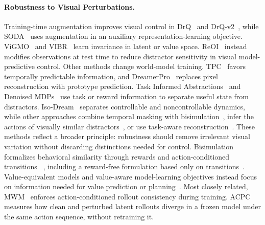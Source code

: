 \documentclass[10pt]{article}
\begin{document}
\paragraph{Robustness to Visual Perturbations.}
Training-time augmentation improves visual control in
DrQ~\cite{kostrikov2020drq} and DrQ-v2~\cite{yarats2022drqv2}, while
SODA~\cite{hansen2021soda} uses augmentation in an auxiliary
representation-learning objective. ViGMO~\cite{vigmo} and
VIBR~\cite{dupuis2023vibr} learn invariance in latent or value space.
ReOI~\cite{chen2025reoi} instead modifies observations at test time to reduce
distractor sensitivity in visual model-predictive control. Other methods
change world-model training. TPC~\cite{nguyen2021tpc} favors temporally
predictable information, and DreamerPro~\cite{deng2022dreamerpro} replaces
pixel reconstruction with prototype prediction. Task Informed
Abstractions~\cite{fu2021tia} and Denoised
MDPs~\cite{wang2022denoisedmdps} use task or reward information to separate
useful state from distractors. Iso-Dream~\cite{pan2022isodream} separates
controllable and noncontrollable dynamics, while other approaches combine
temporal masking with bisimulation~\cite{sun2024latentrobustwm}, infer the
actions of visually similar distractors~\cite{wang2024ad3}, or use task-aware
reconstruction~\cite{hutson2024policyshaped}. These methods reflect a broader
principle: robustness should remove irrelevant visual variation without
discarding distinctions needed for control. Bisimulation formalizes
behavioral similarity through rewards and action-conditioned transitions
~\cite{gelada2019deepmdp,zhang2021dbc,bsmpc}, including a reward-free
formulation based only on transitions~\cite{toso2026bisimjepa}.
Value-equivalent models and value-aware model-learning objectives instead
focus on information needed for value prediction or
planning~\cite{grimm2020valueequivalence,voelcker2025calibratedvalueaware}.
Most closely related, MWM~\cite{yan2026mwm} enforces action-conditioned
rollout consistency during training. ACPC measures how clean and perturbed
latent rollouts diverge in a frozen model under the same action sequence,
without retraining it.
\end{document}
